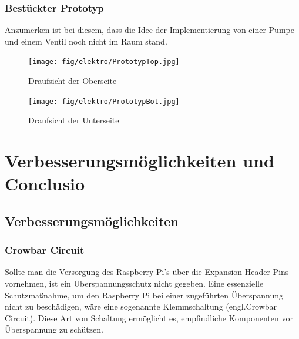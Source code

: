 \subsubsection{Bestückter Prototyp}

Anzumerken ist bei diesem, dass die Idee der Implementierung von einer Pumpe und einem Ventil noch nicht im Raum stand.

\begin{figure}[hb]
    \centering
    \texttt{[image: fig/elektro/PrototypTop.jpg]}
    \caption{Draufsicht der Oberseite}
\end{figure}

\begin{figure}[hb]
    \centering
    \texttt{[image: fig/elektro/PrototypBot.jpg]}
    \caption{Draufsicht der Unterseite}
\end{figure}


\newpage
\section{Verbesserungsmöglichkeiten und Conclusio}
\subsection{Verbesserungsmöglichkeiten}

\subsubsection{Crowbar Circuit}
Sollte man die Versorgung des Raspberry Pi's über die Expansion Header Pins vornehmen, ist ein Überspannungsschutz nicht gegeben.
Eine essenzielle Schutzmaßnahme, um den Raspberry Pi bei einer zugeführten Überspannung nicht zu beschädigen, wäre eine sogenannte Klemmschaltung (engl.Crowbar Circuit).
Diese Art von Schaltung ermöglicht es, empfindliche Komponenten vor Überspannung zu schützen.

